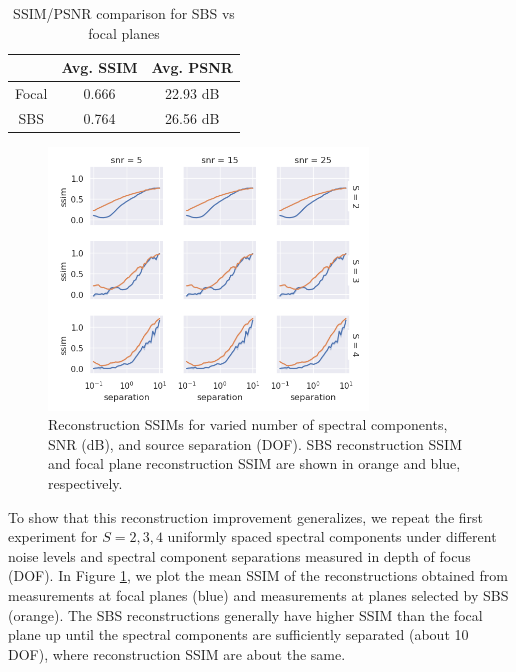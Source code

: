 \documentclass{article}
\begin{document}

\begin{table}[h]
\caption{SSIM/PSNR comparison for SBS vs focal planes}
\vspace{0.08 in}
\centering
\begin{tabular}{|c|c|c|}
\hline
      & Avg. SSIM  & Avg. PSNR  \\ \hline
Focal & 0.666 & 22.93 dB \\ \hline
SBS  & 0.764 & 26.56 dB \\ \hline
\end{tabular}
\label{tab:ssims}
\end{table}

\begin{figure}[htb]
  \begin{minipage}[b]{1\linewidth}
    \centering
    \centerline{\includegraphics[width=8.5cm]{ratio}}
  \end{minipage}
  \caption{Reconstruction SSIMs for varied number of spectral components, SNR (dB), and source separation (DOF). SBS reconstruction SSIM and
  focal plane reconstruction SSIM are shown in orange and blue, respectively.}
  \label{fig:ratio}
\end{figure}

To show that this reconstruction improvement generalizes, we repeat the first experiment for $S = 2, 3, 4$
uniformly spaced spectral components under different noise levels and
spectral component separations measured in depth of focus (DOF).  In Figure \ref{fig:ratio}, we plot the mean
SSIM of the reconstructions obtained from measurements at focal planes (blue)
and measurements at planes selected by SBS (orange).  The SBS reconstructions
generally have higher SSIM than the focal plane up until the spectral components are sufficiently separated (about 10 DOF), where reconstruction SSIM are about the same.
\end{document}
